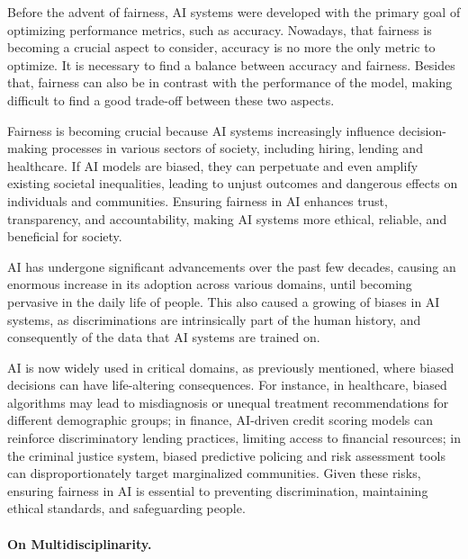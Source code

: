 \documentclass[12pt,a4paper,openright,twoside]{book}
\begin{document}
Before the advent of fairness, \ac{AI} systems were developed with the primary goal of optimizing performance metrics, such as accuracy.
%
Nowadays, that fairness is becoming a crucial aspect to consider, accuracy is no more the only metric to optimize.
%
It is necessary to find a balance between accuracy and fairness.
%
Besides that, fairness can also be in contrast with the performance of the model, making difficult to find a good trade-off between these two aspects.

Fairness is becoming crucial because \ac{AI} systems increasingly influence decision-making processes in various sectors of society, including hiring, lending and healthcare.
%
If \ac{AI} models are biased, they can perpetuate and even amplify existing societal inequalities, leading to unjust outcomes and dangerous effects on individuals and communities.
%
Ensuring fairness in \ac{AI} enhances trust, transparency, and accountability, making \ac{AI} systems more ethical, reliable, and beneficial for society.

\ac{AI} has undergone significant advancements over the past few decades, causing an enormous increase in its adoption across various domains, until becoming pervasive in the daily life of people.
%
This also caused a growing of biases in \ac{AI} systems, as discriminations are intrinsically part of the human history, and consequently of the data that \ac{AI} systems are trained on.



\ac{AI} is now widely used in critical domains, as previously mentioned, where biased decisions can have life-altering consequences.
%
For instance, in healthcare, biased algorithms may lead to misdiagnosis or unequal treatment recommendations for different demographic groups;
%
in finance, \ac{AI}-driven credit scoring models can reinforce discriminatory lending practices, limiting access to financial resources;
%
in the criminal justice system, biased predictive policing and risk assessment tools can disproportionately target marginalized communities.
%
Given these risks, ensuring fairness in \ac{AI} is essential to preventing discrimination, maintaining ethical standards, and safeguarding people.


\paragraph{On Multidisciplinarity.}
\end{document}
